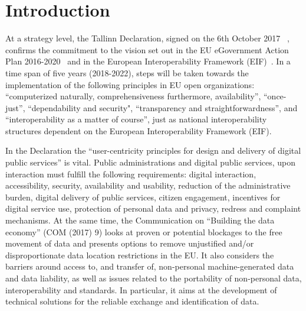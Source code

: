 
\chapter{Introduction}  %

\ifpdf
    \graphicspath{{Chapter1/Figs/Raster/}{Chapter1/Figs/PDF/}{Chapter1/Figs/}}
\else
    \graphicspath{{Chapter1/Figs/Vector/}{Chapter1/Figs/}}
\fi

At a strategy level, the Tallinn Declaration, signed on the 6th October 2017
~\citep{tallin_declaration}, confirms the commitment to the vision set out in the EU eGovernment
Action Plan 2016-2020~\citep{action_plan} and in the European Interoperability Framework (EIF)~\citep{eif}.
In a time span of five years (2018-2022), steps will be taken towards
the implementation of the following principles in EU open organizations: “computerized
naturally, comprehensiveness furthermore, availability”, “once-just”, “dependability
and security", “transparency and straightforwardness”, and “interoperability as a
matter of course”, just as national interoperability structures dependent on the
European Interoperability Framework (EIF).

In the Declaration the “user-centricity principles for design and delivery of
digital public services” is vital. Public administrations and digital public services,
upon interaction must fulfill the following requirements: digital interaction, accessibility, security, availability
and usability, reduction of the administrative burden, digital delivery of public services,
citizen engagement, incentives for digital service use, protection of personal data and
privacy, redress and complaint mechanisms. At the same time, the Communication on “Building the data economy” (COM (2017) 9)
looks at proven or potential blockages to the free movement of data and presents
options to remove unjustified and/or disproportionate data location restrictions
in the EU. It also considers the barriers around access to, and transfer of,
non-personal machine-generated data and data liability, as well as issues related
to the portability of non-personal data, interoperability and standards.
In particular, it aims at the development of technical solutions for
the reliable exchange and identification of data. 


